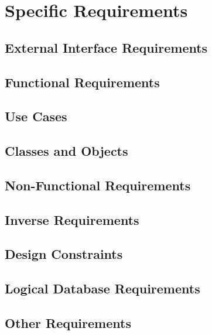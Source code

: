 
\section{Specific Requirements}

	\subsection{External Interface Requirements}
		

	\subsection{Functional Requirements}
		
		
		
		
		
		

	\subsection{Use Cases}
		
		
		
		
		
		

	\subsection{Classes and Objects}
		
		
		
		
				
		

	\subsection{Non-Functional Requirements}
		

	\subsection{Inverse Requirements}


	\subsection{Design Constraints}


	\subsection{Logical Database Requirements}


	\subsection{Other Requirements}